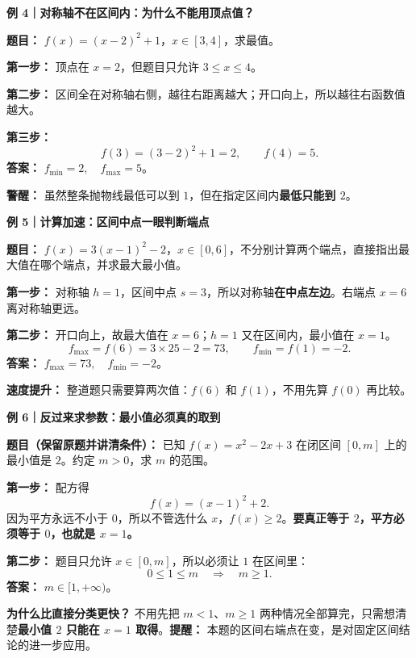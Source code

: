 \clearpage
\begin{examplebox}
\textbf{\textcolor{CExample}{例 4｜对称轴不在区间内：为什么不能用顶点值？}}



\textbf{题目：} $f(x)=(x-2)^2+1$，$x\in[3,4]$，求最值。

\textbf{第一步：} 顶点在 $x=2$，但题目只允许 $3\le x\le4$。

\textbf{第二步：} 区间全在对称轴右侧，越往右距离越大；开口向上，所以越往右函数值越大。

\textbf{第三步：}
\[
 f(3)=(3-2)^2+1=2,\qquad f(4)=5.
\]
\textbf{答案：} $\boxed{f_{\min}=2,\quad f_{\max}=5}$。

\textbf{警醒：} 虽然整条抛物线最低可以到 $1$，但在指定区间内\textbf{最低只能到 $2$}。

\medskip

\end{examplebox}
\clearpage
\begin{examplebox}
\textbf{\textcolor{CExample}{例 5｜计算加速：区间中点一眼判断端点}}



\textbf{题目：} $f(x)=3(x-1)^2-2$，$x\in[0,6]$，不分别计算两个端点，直接指出最大值在哪个端点，并求最大最小值。

\textbf{第一步：} 对称轴 $h=1$，区间中点 $s=3$，所以对称轴\textbf{在中点左边}。右端点 $x=6$ 离对称轴更远。

\textbf{第二步：} 开口向上，故最大值在 $x=6$；$h=1$ 又在区间内，最小值在 $x=1$。
\[
 f_{\max}=f(6)=3\times25-2=73,\qquad f_{\min}=f(1)=-2.
\]
\textbf{答案：} $\boxed{f_{\max}=73,\quad f_{\min}=-2}$。

\textbf{速度提升：} 整道题只需要算两次值：$f(6)$ 和 $f(1)$，不用先算 $f(0)$ 再比较。

\medskip

\end{examplebox}
\clearpage
\begin{examplebox}
\textbf{\textcolor{CExample}{例 6｜反过来求参数：最小值必须真的取到}}



\textbf{题目（保留原题并讲清条件）：} 已知 $f(x)=x^2-2x+3$ 在闭区间 $[0,m]$ 上的最小值是 $2$。约定 $m>0$，求 $m$ 的范围。

\textbf{第一步：} 配方得
\[
 f(x)=(x-1)^2+2.
\]
因为平方永远不小于 $0$，所以不管选什么 $x$，$f(x)\ge2$。\textbf{要真正等于 $2$，平方必须等于 $0$，也就是 $x=1$。}

\textbf{第二步：} 题目只允许 $x\in[0,m]$，所以必须让 $1$ 在区间里：
\[
 0\le1\le m \quad\Longrightarrow\quad m\ge1.
\]
\textbf{答案：} $\boxed{m\in[1,+\infty)}$。

\textbf{为什么比直接分类更快？} 不用先把 $m<1$、$m\ge1$ 两种情况全部算完，只需想清楚\textbf{最小值 $2$ 只能在 $x=1$ 取得}。\textbf{提醒：} 本题的区间右端点在变，是对固定区间结论的进一步应用。

\medskip

\end{examplebox}
